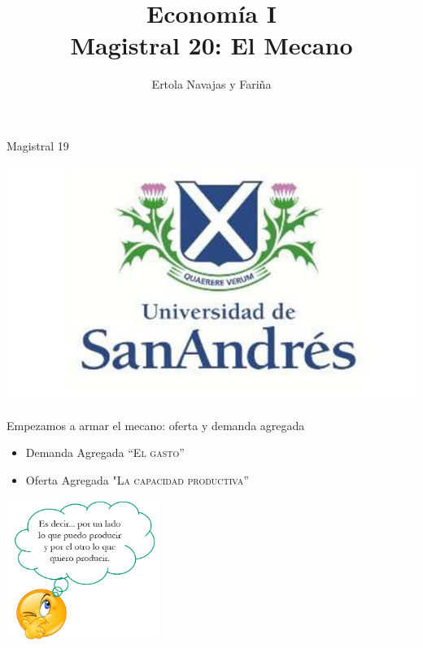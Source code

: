 \documentclass{beamer}
\title[Economía I]{Economía I \vspace{4mm}
\\ Magistral 20: El Mecano}
\date{}
\author[Ertola Navajas y Fariña]{Ertola Navajas y Fariña}
\institute[]{Universidad de San Andrés}
\begin{document}
\begin{frame}
\titlepage
\centering
Magistral 19

\includegraphics[scale=0.2]{Slides Principios de Economia/Figures/logoUDESA.jpg} 
\end{frame}


\begin{frame}{Empezamos a armar el mecano: oferta y demanda agregada}

    \begin{itemize}
        \item Demanda Agregada \textsc{“El gasto”} \faCartPlus
        \item Oferta Agregada \textsc{"La capacidad productiva”} \faIndustry
    \end{itemize}
    \vspace{3mm}
    
    \centering\includegraphics[width=5cm]{Slides Principios de Economia/Figures/P17b.png}\

\end{frame}
\end{document}
